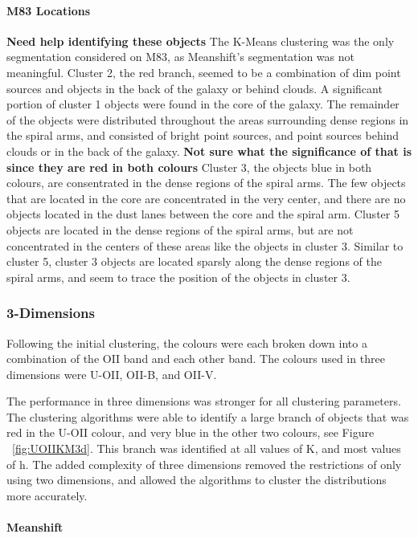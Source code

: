 \paragraph{M83 Locations}
\textbf{Need help identifying these objects}
The K-Means clustering was the only segmentation considered on M83, as Meanshift's segmentation was not meaningful.
Cluster 2, the red branch, seemed to be a combination of dim point sources and objects in the back of the galaxy or behind clouds.
A significant portion of cluster 1 objects were found in the core of the galaxy.
The remainder of the objects were distributed throughout the areas surrounding dense regions in the spiral arms, and consisted of bright point sources, and point sources behind clouds or in the back of the galaxy. \textbf{Not sure what the significance of that is since they are red in both colours}
Cluster 3, the objects blue in both colours, are consentrated in the dense regions of the spiral arms.
The few objects that are located in the core are concentrated in the very center, and there are no objects located in the dust lanes between the core and the spiral arm.
Cluster 5 objects are located in the dense regions of the spiral arms, but are not concentrated in the centers of these areas like the objects in cluster 3.
Similar to cluster 5, cluster 3 objects are located sparsly along the dense regions of the spiral arms, and seem to trace the position of the objects in cluster 3. 

\subsubsection{3-Dimensions}

Following the initial clustering, the colours were each broken down into a combination of the OII band and each other band.
The colours used in three dimensions were U-OII, OII-B, and OII-V.

The performance in three dimensions was stronger for all clustering parameters.
The clustering algorithms were able to identify a large branch of objects that was red in the U-OII colour, and very blue in the other two colours, see Figure ~\ref{fig:UOIIKM3d}.
This branch was identified at all values of K, and most values of h.
The added complexity of three dimensions removed the restrictions of only using two dimensions, and allowed the algorithms to cluster the distributions more accurately.

\paragraph{Meanshift}

